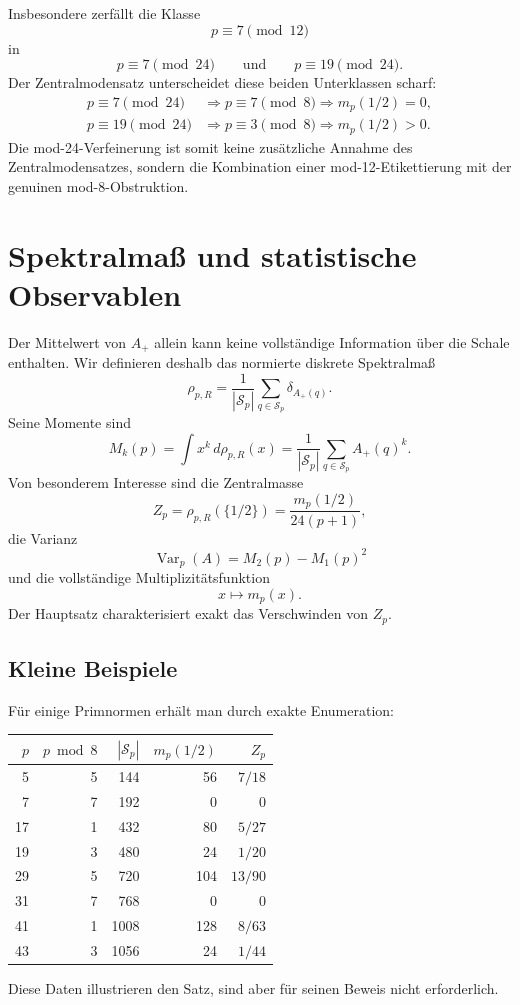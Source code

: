 \documentclass[11pt,a4paper]{article}
\theoremstyle{definition}
\begin{document}
Insbesondere zerfällt die Klasse
\[
p\equiv7\pmod{12}
\]
in
\[
p\equiv7\pmod{24}
\qquad\text{und}\qquad
p\equiv19\pmod{24}.
\]
Der Zentralmodensatz unterscheidet diese beiden Unterklassen scharf:
\begin{align*}
p\equiv7\pmod{24}&\Longrightarrow p\equiv7\pmod8\Longrightarrow m_p(1/2)=0,\\
p\equiv19\pmod{24}&\Longrightarrow p\equiv3\pmod8\Longrightarrow m_p(1/2)>0.
\end{align*}
Die mod-24-Verfeinerung ist somit keine zusätzliche Annahme des Zentralmodensatzes, sondern die Kombination einer mod-12-Etikettierung mit der genuinen mod-8-Obstruktion.

\section{Spektralmaß und statistische Observablen}
Der Mittelwert von $A_+$ allein kann keine vollständige Information über die Schale enthalten. Wir definieren deshalb das normierte diskrete Spektralmaß
\begin{equation}\label{eq:spectralmeasure}
\rho_{p,R}=\frac1{|\mathcal S_p|}\sum_{q\in\mathcal S_p}\delta_{A_+(q)}.
\end{equation}
Seine Momente sind
\[
M_k(p)=\int x^k\,d\rho_{p,R}(x)
=\frac1{|\mathcal S_p|}\sum_{q\in\mathcal S_p}A_+(q)^k.
\]
Von besonderem Interesse sind die Zentralmasse
\[
Z_p=\rho_{p,R}(\{1/2\})=\frac{m_p(1/2)}{24(p+1)},
\]
die Varianz
\[
\operatorname{Var}_p(A)=M_2(p)-M_1(p)^2
\]
und die vollständige Multiplizitätsfunktion
\[
x\longmapsto m_p(x).
\]
Der Hauptsatz charakterisiert exakt das Verschwinden von $Z_p$.

\subsection{Kleine Beispiele}
Für einige Primnormen erhält man durch exakte Enumeration:
\begin{center}
\begin{tabular}{rrrrr}
\toprule
$p$ & $p\bmod8$ & $|\mathcal S_p|$ & $m_p(1/2)$ & $Z_p$\\
\midrule
5  & 5 & 144  & 56 & $7/18$\\
7  & 7 & 192  & 0  & $0$\\
17 & 1 & 432  & 80 & $5/27$\\
19 & 3 & 480  & 24 & $1/20$\\
29 & 5 & 720  & 104 & $13/90$\\
31 & 7 & 768  & 0 & $0$\\
41 & 1 & 1008 & 128 & $8/63$\\
43 & 3 & 1056 & 24 & $1/44$\\
\bottomrule
\end{tabular}
\end{center}
Diese Daten illustrieren den Satz, sind aber für seinen Beweis nicht erforderlich.
\end{document}
